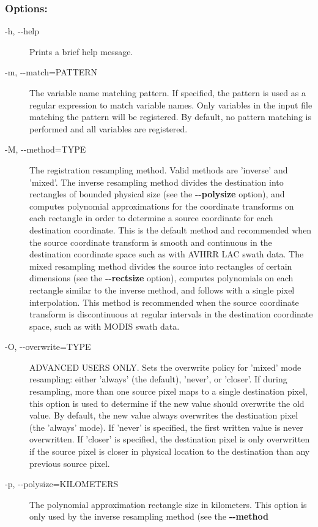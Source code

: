 \subsubsection*{Options:}
\begin{description}
\item[-h, -{-}help]Prints a brief help message.
\item[-m, -{-}match=PATTERN]The variable name matching pattern. If specified, the pattern is used as a regular expression to match variable names. Only variables in the input file matching the pattern will be registered. By default, no pattern matching is performed and all variables are registered.
\item[-M, -{-}method=TYPE]The registration resampling method. Valid methods are 'inverse' and 'mixed'. The inverse resampling method divides the destination into rectangles of bounded physical size (see the \textbf{-{-}polysize}
 option), and computes polynomial approximations for the coordinate transforms on each rectangle in order to determine a source coordinate for each destination coordinate. This is the default method and recommended when the source coordinate transform is smooth and continuous in the destination coordinate space such as with AVHRR LAC swath data. The mixed resampling method divides the source into rectangles of certain dimensions (see the \textbf{-{-}rectsize}
 option), computes polynomials on each rectangle similar to the inverse method, and follows with a single pixel interpolation. This method is recommended when the source coordinate transform is discontinuous at regular intervals in the destination coordinate space, such as with MODIS swath data.
\item[-O, -{-}overwrite=TYPE]ADVANCED USERS ONLY. Sets the overwrite policy for 'mixed' mode resampling: either 'always' (the default), 'never', or 'closer'. If during resampling, more than one source pixel maps to a single destination pixel, this option is used to determine if the new value should overwrite the old value. By default, the new value always overwrites the destination pixel (the 'always' mode). If 'never' is specified, the first written value is never overwritten. If 'closer' is specified, the destination pixel is only overwritten if the source pixel is closer in physical location to the destination than any previous source pixel.
\item[-p, -{-}polysize=KILOMETERS]The polynomial approximation rectangle size in kilometers. This option is only used by the inverse resampling method (see the \textbf{-{-}method}

\end{description}

